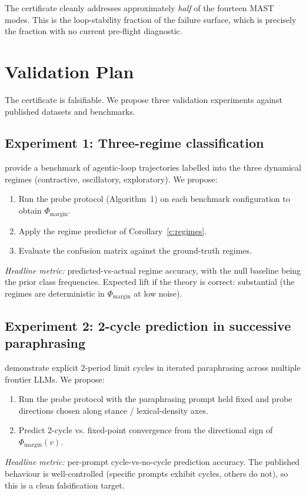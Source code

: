 \documentclass[11pt,a4paper]{article}
\theoremstyle{definition}
\theoremstyle{remark}
\newcommand{\PhaseMargin}{\Phi_{\mathrm{margin}}}
\begin{document}
The certificate cleanly addresses approximately \emph{half} of the
fourteen MAST modes.  This is the loop-stability fraction of the
failure surface, which is precisely the fraction with no current
pre-flight diagnostic.

\section{Validation Plan}\label{sec:validation}

The certificate is falsifiable.  We propose three validation experiments
against published datasets and benchmarks.

\subsection{Experiment 1: Three-regime classification}\label{ssec:exp-regime}

\citet{Tacheny2025AgenticLoops} provide a benchmark of agentic-loop
trajectories labelled into the three dynamical regimes (contractive,
oscillatory, exploratory).  We propose:
\begin{enumerate}[leftmargin=*]
\item Run the probe protocol (Algorithm~1) on each
benchmark configuration to obtain $\PhaseMargin$.
\item Apply the regime predictor of Corollary~\ref{c:regimes}.
\item Evaluate the confusion matrix against the ground-truth regimes.
\end{enumerate}
\textit{Headline metric:} predicted-vs-actual regime accuracy, with the
null baseline being the prior class frequencies.  Expected lift if the
theory is correct: substantial (the regimes are deterministic in
$\PhaseMargin$ at low noise).

\subsection{Experiment 2: 2-cycle prediction in successive paraphrasing}\label{ssec:exp-cycle}

\citet{Wang2025AttractorCycles} demonstrate explicit 2-period limit cycles
in iterated paraphrasing across multiple frontier LLMs.  We propose:
\begin{enumerate}[leftmargin=*]
\item Run the probe protocol with the paraphrasing prompt held fixed
and probe directions chosen along stance / lexical-density axes.
\item Predict 2-cycle vs. fixed-point convergence from the directional
sign of $\PhaseMargin(v)$.
\end{enumerate}
\textit{Headline metric:} per-prompt cycle-vs-no-cycle prediction
accuracy.  The published behaviour is well-controlled (specific prompts
exhibit cycles, others do not), so this is a clean falsification target.
\end{document}
